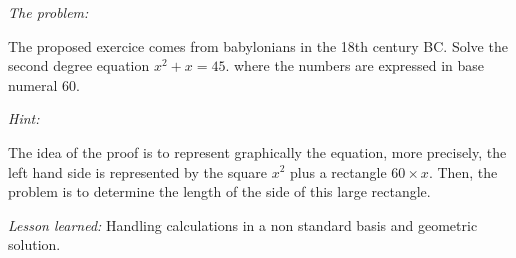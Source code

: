 \noindent \textit{The problem:}

The proposed exercice comes from babylonians in the 18th century BC.
Solve the second degree equation $x^2 + x = 45$. where the numbers are expressed in base numeral $60$. 
\medskip

\noindent \textit{Hint:}

The idea of the proof is to represent graphically the equation,
more precisely, the left hand side is represented by the square $x^2$ plus a rectangle $60 \times x$.
Then, the problem is to determine the length of the side of this large rectangle.
\medskip

\noindent \textit{Lesson learned:}
Handling calculations in a non standard basis and geometric solution. 

